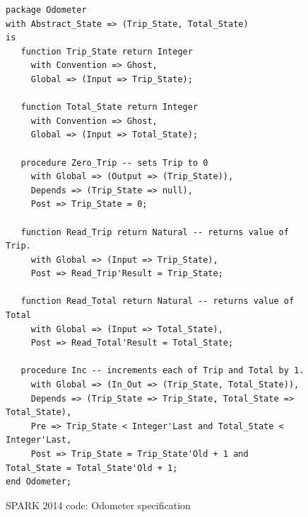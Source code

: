 \begin{figure}
\singlespacing
\begin{lstlisting}[language=ada2012, frame=single, gobble=0]
package Odometer
with Abstract_State => (Trip_State, Total_State)
is
   function Trip_State return Integer
     with Convention => Ghost,
     Global => (Input => Trip_State);

   function Total_State return Integer
     with Convention => Ghost,
     Global => (Input => Total_State);

   procedure Zero_Trip -- sets Trip to 0
     with Global => (Output => (Trip_State)),
     Depends => (Trip_State => null),
     Post => Trip_State = 0;

   function Read_Trip return Natural -- returns value of Trip.
     with Global => (Input => Trip_State),
     Post => Read_Trip'Result = Trip_State;

   function Read_Total return Natural -- returns value of Total
     with Global => (Input => Total_State),
     Post => Read_Total'Result = Total_State;

   procedure Inc -- increments each of Trip and Total by 1.
     with Global => (In_Out => (Trip_State, Total_State)),
     Depends => (Trip_State => Trip_State, Total_State => Total_State),
     Pre => Trip_State < Integer'Last and Total_State < Integer'Last,
     Post => Trip_State = Trip_State'Old + 1 and Total_State = Total_State'Old + 1;
end Odometer;
\end{lstlisting}
\doublespacing
\caption{SPARK 2014 code: Odometer specification}
\label{listing:Odometer2014_spec}
\end{figure}

